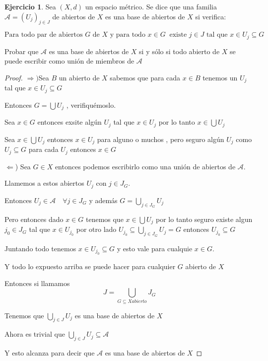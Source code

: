 \documentclass[11pt]{report}
\newcommand{\Ra}{\Rightarrow}
\theoremstyle{definition}
\newtheorem{ej}{Ejercicio}
\begin{document}
\begin{ej}
	Sea $(X,d)$ un espacio métrico. Se dice que una familia $\mathcal{A} = (U_j)_{j\in J}$ de abiertos de $X$ es una base de abiertos de $X$ si verifica:

	$$\text{Para todo par de abiertos } G \text{ de } X \text{ y para todo } x\in G \ \text{ existe } j\in  J \text{ tal que } x\in U_j \subseteq G$$

	Probar que $\mathcal{A}$ es una base de abiertos de $X$ si y sólo si todo abierto de $X$ se puede escribir como unión de miembros de $\mathcal{A}$

	\begin{proof}
		$\Ra )$Sea $B$ un abierto de $X$ sabemos que para cada $x \in B$ tenemos un $U_j$ tal que $x \in U_j \subseteq G$

		Entonces $G = \bigcup U_j$ , verifiquémoslo.

		Sea $x \in G$ entonces exsite algún $U_j$ tal que $x \in U_j$ por lo tanto $x \in \bigcup U_j$

		Sea $x \in \bigcup U_j$ entonces $x \in U_j$ para alguno o muchos , pero seguro algún $U_j$ como $U_j \subseteq G$ para cada $U_j$ entonces $x \in G$

		$\Leftarrow$) Sea $G \in X$ entonces podemos escribirlo como una unión de abiertos de $\mathcal{A}$.

		Llamemos a estos abiertos $U_j$ con $j \in J_G$.

		Entonces $U_j \in \mathcal{A} \quad \forall j \in J_G$ y además $G = \bigcup_{j \in J_G} U_j$

		Pero entonces dado $x \in G$ tenemos que $x \in \bigcup U_j$ por lo tanto seguro existe algun $j_0 \in J_G$ tal que $x \in U_{j_0}$ por otro lado $U_{j_0} \subseteq \bigcup_{j \in J_G} U_j = G$ entonces $U_{j_0} \subseteq G$

		Juntando todo tenemos $x \in U_{j_0} \subseteq G$ y esto vale para cualquie $x \in G$.

		Y todo lo expuesto arriba se puede hacer para cualquier $G$ abierto de $X$ 

		Entonces si llamamos $$J= \bigcup_{G\subseteq X abierto } J_G $$

		Tenemos que $\bigcup_{j\in J }U_j $ es una base de abiertos de $X$

		Ahora es trivial que $\bigcup_{j \in J} U_j \subseteq \mathcal{A}$

		Y esto alcanza para decir que $\mathcal{A}$ es una base de abiertos de $X$ 
	\end{proof}
	
	
\end{ej}
\end{document}
